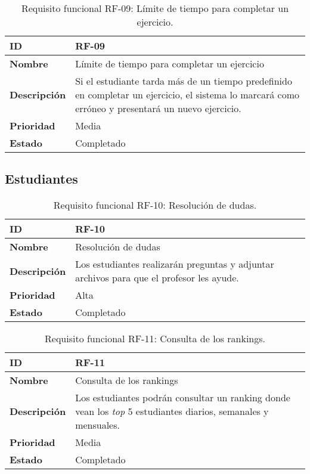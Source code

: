 \begin{table}[H]
    \centering
    \begin{tabular}{|l|p{9.5cm}|}
        \hline
        \textbf{ID} & RF-09 \\
        \hline
        \textbf{Nombre} & Límite de tiempo para completar un ejercicio \\
        \hline
        \textbf{Descripción} & Si el estudiante tarda más de un tiempo predefinido en completar un ejercicio, el sistema lo marcará como erróneo y presentará un nuevo ejercicio. \\
        \hline
        \textbf{Prioridad} & Media \\
        \hline
        \textbf{Estado} & Completado \\
        \hline
    \end{tabular}
    \caption{Requisito funcional RF-09: Límite de tiempo para completar un ejercicio.}
    \label{table:req-RF00Y}
\end{table}

\subsection{Estudiantes}

\begin{table}[H]
    \centering
    \begin{tabular}{|l|p{9.5cm}|}
        \hline
        \textbf{ID} & RF-10 \\
        \hline
        \textbf{Nombre} & Resolución de dudas \\
        \hline
        \textbf{Descripción} & Los estudiantes realizarán preguntas y adjuntar archivos para que el profesor les ayude. \\
        \hline
        \textbf{Prioridad} & Alta \\
        \hline
        \textbf{Estado} & Completado \\
        \hline
    \end{tabular}
    \caption{Requisito funcional RF-10: Resolución de dudas.}
    \label{table:req-RF006}
\end{table}

\begin{table}[H]
    \centering
    \begin{tabular}{|l|p{9.5cm}|}
        \hline
        \textbf{ID} & RF-11 \\
        \hline
        \textbf{Nombre} & Consulta de los rankings \\
        \hline
        \textbf{Descripción} & Los estudiantes podrán consultar un ranking donde vean los \textit{top} 5 estudiantes diarios, semanales y mensuales. \\
        \hline
        \textbf{Prioridad} & Media \\
        \hline
        \textbf{Estado} & Completado \\
        \hline
    \end{tabular}
    \caption{Requisito funcional RF-11: Consulta de los rankings.}
    \label{table:req-RF00Z}
\end{table}

